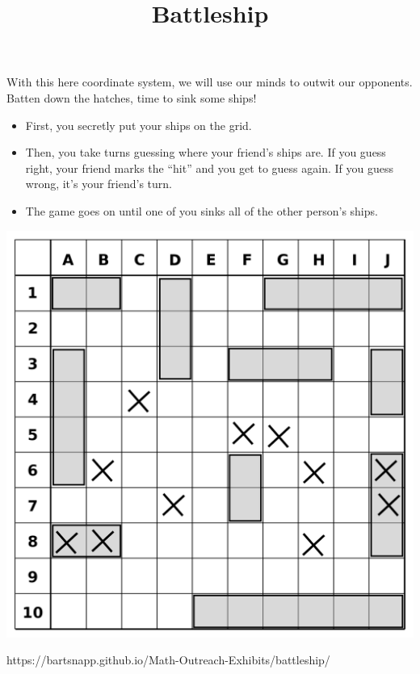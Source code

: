 \documentclass{../exhibit}
\title{Battleship}
\begin{document}
\begin{context}
  With this here coordinate system, we will use our minds to outwit
  our opponents.
  \\[1cm]
    Batten down the hatches, time to sink some ships!

  
\end{context}

\begin{directions}
\begin{itemize}
\item First, you secretly put your ships on the grid.
\item Then, you take turns guessing where your friend's ships are. If
  you guess right, your friend marks the ``hit'' and you get to guess
  again.  If you guess wrong, it's your friend's turn.
\item The game goes on until one of you sinks all of the other person's
ships.
\end{itemize}

\end{directions}

\begin{example}%
    \begin{center}
    \includegraphics[width=.5\textwidth]{gameboard.png}
  \end{center}
\end{example}

\begin{mathConnections}
  https://bartsnapp.github.io/Math-Outreach-Exhibits/battleship/
\end{mathConnections}
\end{document}
